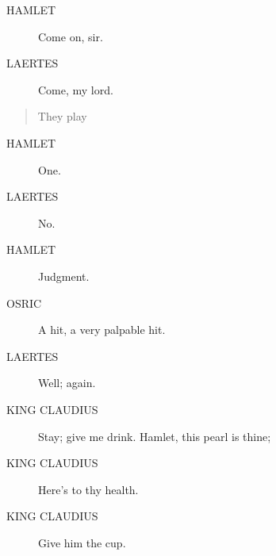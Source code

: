 \documentclass{article}
\begin{document}
\begin{description}
            
\item[HAMLET] Come on, sir.
\end{description}
          
\begin{description}
            
\item[LAERTES] Come, my lord.
\end{description}
          
\begin{quote}
They play
\end{quote}
          
\begin{description}
            
\item[HAMLET] One.
\end{description}
          
\begin{description}
            
\item[LAERTES] No.
\end{description}
          
\begin{description}
            
\item[HAMLET] Judgment.
\end{description}
          
\begin{description}
            
\item[OSRIC] A hit, a very palpable hit.
\end{description}
          
\begin{description}
            
\item[LAERTES] Well; again.
\end{description}
          
\begin{description}
            
\item[KING CLAUDIUS] Stay; give me drink. Hamlet, this pearl is thine;
\item[KING CLAUDIUS] Here's to thy health.
\item[KING CLAUDIUS] Give him the cup.
\end{description}
          
\end{document}
